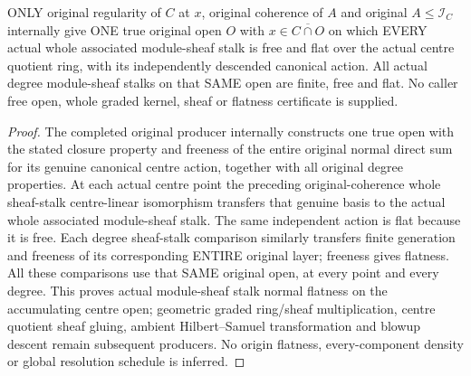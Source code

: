 \begin{theorem}
\label{hir:real-domain-original-actual-normal-associated-sheaf-free-open}
\leanok
ONLY original regularity of $C$ at $x$, original coherence of $A$ and
original $A\leq\mathcal I_C$ internally give ONE true original open $O$
with $x\in\overline{C\cap O}$ on which EVERY actual whole associated
module-sheaf stalk is free and flat over the actual centre quotient
ring, with its independently descended canonical action. All actual
degree module-sheaf stalks on that SAME open are finite, free and flat.
No caller free open, whole graded kernel, sheaf or flatness certificate
is supplied.
\end{theorem}
\begin{proof}
The completed original producer internally constructs one true open with
the stated closure property and freeness of the entire original normal
direct sum for its genuine canonical centre action, together with all
original degree properties. At each actual centre point the preceding
original-coherence whole sheaf-stalk centre-linear isomorphism transfers
that genuine basis to the actual whole associated module-sheaf stalk.
The same independent action is flat because it is free. Each degree
sheaf-stalk comparison similarly transfers finite generation and
freeness of its corresponding ENTIRE original layer; freeness gives
flatness. All these comparisons use that SAME original open, at every
point and every degree. This proves actual module-sheaf stalk normal
flatness on the accumulating centre open; geometric graded ring/sheaf
multiplication, centre quotient sheaf gluing, ambient Hilbert--Samuel
transformation and blowup descent remain subsequent producers. No
origin flatness, every-component density or global resolution schedule
is inferred.
\end{proof}
